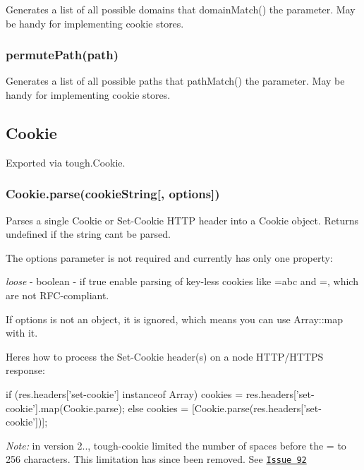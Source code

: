 Generates a list of all possible domains that {\ttfamily domain\+Match()} the parameter. May be handy for implementing cookie stores.

\subsubsection*{{\ttfamily permute\+Path(path)}}

Generates a list of all possible paths that {\ttfamily path\+Match()} the parameter. May be handy for implementing cookie stores.

\subsection*{Cookie}

Exported via {\ttfamily tough.\+Cookie}.

\subsubsection*{{\ttfamily Cookie.\+parse(cookie\+String\mbox{[}, options\mbox{]})}}

Parses a single Cookie or Set-\/\+Cookie H\+T\+TP header into a {\ttfamily Cookie} object. Returns {\ttfamily undefined} if the string can\textquotesingle{}t be parsed.

The options parameter is not required and currently has only one property\+:


\begin{DoxyItemize}
\item {\itshape loose} -\/ boolean -\/ if {\ttfamily true} enable parsing of key-\/less cookies like {\ttfamily =abc} and {\ttfamily =}, which are not R\+F\+C-\/compliant.
\end{DoxyItemize}

If options is not an object, it is ignored, which means you can use {\ttfamily Array\+::map} with it.

Here\textquotesingle{}s how to process the Set-\/\+Cookie header(s) on a node H\+T\+T\+P/\+H\+T\+T\+PS response\+:


\begin{DoxyCode}
if (res.headers['set-cookie'] instanceof Array)
  cookies = res.headers['set-cookie'].map(Cookie.parse);
else
  cookies = [Cookie.parse(res.headers['set-cookie'])];
\end{DoxyCode}


{\itshape Note\+:} in version 2.., tough-\/cookie limited the number of spaces before the {\ttfamily =} to 256 characters. This limitation has since been removed. See \href{https://github.com/salesforce/tough-cookie/issues/92}{\tt Issue 92}

